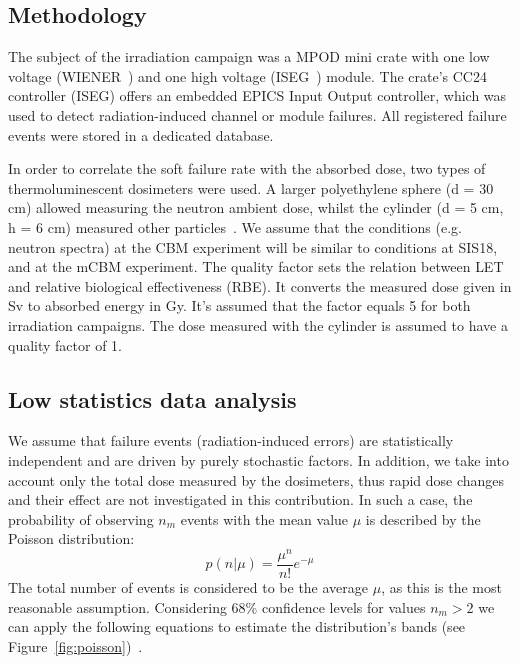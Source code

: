 \subsection{Methodology}

The subject of the irradiation campaign was a MPOD mini crate with one low voltage (WIENER~\cite{wiener}) and one high voltage (ISEG~\cite{iseg}) module. The crate's CC24 controller (ISEG) offers an embedded \gls{EPICS} Input Output controller, which was used to detect radiation-induced channel or module failures. All registered  failure events were stored in a dedicated database.  

In order to correlate the soft failure rate with the absorbed dose, two types of thermoluminescent dosimeters were used. A larger polyethylene sphere (d = 30 cm) allowed measuring the neutron ambient dose, whilst the cylinder (d = 5 cm, h = 6 cm) measured other particles~\cite{bonner}. We assume that the conditions (e.g. neutron spectra) at the \gls{CBM} experiment will be similar to conditions at SIS18, and at the \gls{mCBM} experiment. The quality factor sets the relation between \gls{LET} and relative biological effectiveness (\gls{RBE}). It converts the measured dose given in Sv to absorbed energy in Gy. It's assumed that the factor equals 5 for both irradiation campaigns. The dose measured with the cylinder is assumed to have a quality factor of 1.

\subsection{Low statistics data analysis}

We assume that failure events (radiation-induced errors) are statistically independent and are driven by purely stochastic factors. In addition, we take into account only the total dose measured by the dosimeters, thus rapid dose changes and their effect are not investigated in this contribution. In such a case, the probability of observing $n_{m}$ events with the mean value $\mu$ is described by the Poisson distribution:\newline
\begin{equation}
    p(n|\mu) = \frac{\mu^{n}}{n!}e^{-\mu}
\end{equation}
The total number of events is considered to be the average $\mu$, as this is the most reasonable assumption. Considering 68\% confidence levels for values $n_{m} > 2$ we can apply the following equations to estimate the distribution's bands (see Figure~\ref{fig:poisson})~\cite{schmidt}.


